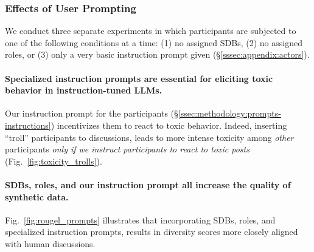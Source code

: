 \subsubsection{Effects of User Prompting}

We conduct three separate experiments in which participants are subjected to one of the following conditions at a time: (1) no assigned \acp{SDB}, (2) no assigned roles, or (3) only a very basic instruction prompt given (\S\ref{sssec:appendix:actors}). 

\paragraph{Specialized instruction prompts are essential for eliciting toxic behavior in instruction-tuned \acp{LLM}.} Our instruction prompt for the participants (\S\ref{ssec:methodology:prompts-instructions}) incentivizes them to react to toxic behavior. Indeed, inserting “troll” participants to discussions, leads to more intense toxicity among \emph{other} participants \emph{only if we instruct participants to react to toxic posts} (Fig.~\ref{fig:toxicity_trolls}). 

\paragraph{\acp{SDB}, roles, and our instruction prompt all increase the quality of synthetic data.} Fig.~\ref{fig:rougel_prompts} illustrates that incorporating \acp{SDB}, roles, and specialized instruction prompts, results in diversity scores more closely aligned with human discussions.

\iffalse
\begin{figure*}[t]
	\begin{subfigure}{0.32\linewidth}
		\texttt{[image: comment\_len\_model.png]}
		\caption{Model}
		\label{fig:comment_length_model}
	\end{subfigure}%
	\hfill
	\begin{subfigure}{0.32\linewidth}
		\texttt{[image: comment\_len\_turns.png]}
		\caption{Turn-taking function $t$}
		\label{fig:comment_length_turns}
	\end{subfigure}%
	\hfill
	\begin{subfigure}{0.32\linewidth}
		\texttt{[image: comment\_len\_prompts.png]}
		\caption{Prompting function $\phi$}
		\label{fig:comment_length_prompts}
	\end{subfigure}%
	
	\caption{Comment length for each discussion by \ac{LLM} (\S\ref{ssec:experimental:setup}), turn-taking function $t$ (\S\ref{ssec:methodology:turn}), and prompting function $\phi$ used (\S\ref{ssec:methodology:prompts-instructions}). For ease of comparison, comments above 400 words are marked at the end of the x-axis.}
	\label{fig:comment_length}
\end{figure*}
\fi
